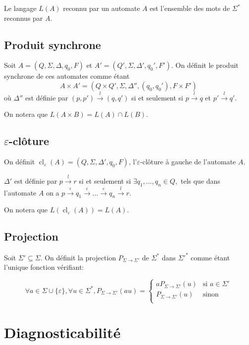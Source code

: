 \documentclass[10pt,a4paper]{article}
\begin{document}
Le langage $L(A)$ reconnu par un automate $A$ est l'ensemble des mots de $\Sigma^*$ reconnus par $A$.

\subsection{Produit synchrone}

Soit $A = (Q, \Sigma, \Delta, q_0, F)$ et $A' = (Q', \Sigma, \Delta', q_0', F')$. On définit le produit synchrone de ces automates comme \'etant $$A\times A' = (Q \times Q', \Sigma, \Delta'', (q_0, q_0'), F\times F')$$ o\`u $\Delta''$ est d\'efinie par $(p,p')\overset{l}{{\to}}(q,q')$ si et seulement si $p\overset{l}{{\to}}q$ et $p'\overset{l}{{\to}}q'$.

On notera que $L(A\times B) = L(A) \cap L(B)$.

\subsection{$\varepsilon$-clôture}

On définit  $\operatorname{cl}_\varepsilon(A) = (Q, \Sigma, \Delta', q_0, F)$, l'$\varepsilon$-clôture \`a gauche de l'automate $A$.

$\Delta'$ est d\'efinie par $p \overset{l}{{\to}} r$ si et seulement si $\exists q_1,\dots,q_n \in Q,$ tels que dans l'automate $A$ on a  $p \overset{\varepsilon}{{\to}} q_1 \overset{\varepsilon}{{\to}} \dots \overset{\varepsilon}{{\to}} q_n \overset{l}{{\to}} r$.

On notera que $L(\operatorname{cl}_\varepsilon(A))=L(A)$.

\subsection{Projection}

Soit $\Sigma'\subseteq \Sigma$. On d\'efinit la projection $P_{\Sigma \to \Sigma'}$ de $\Sigma^*$ dans $\Sigma'^*$ comme \'etant l'unique fonction v\'erifiant:

$$\forall a \in \Sigma \cup \{\varepsilon\}, \forall u \in \Sigma^*, P_{\Sigma \to \Sigma'}(au)=
\left\{\begin{array}{ll}
aP_{\Sigma \to \Sigma'}(u) &\text{si } a\in \Sigma'\\
P_{\Sigma \to \Sigma'}(u) &\text{sinon} \\
\end{array}\right.$$

\section{Diagnosticabilit\'e}
\end{document}
